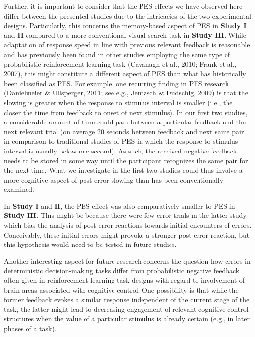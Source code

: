 \documentclass[12pt,openany]{book}
\theoremstyle{definition}
\theoremstyle{definition}
\theoremstyle{definition}
\theoremstyle{remark}
\begin{document}
Further, it is important to consider that the PES effects we have
observed here differ between the presented studies due to the
intricacies of the two experimental designs. Particularly, this concerns
the memory-based aspect of PES in \textbf{Study I} and \textbf{II}
compared to a more conventional visual search task in \textbf{Study
III}. While adaptation of response speed in line with previous relevant
feedback is reasonable and has previously been found in other studies
employing the same type of probabilistic reinforcement learning task
(Cavanagh et al., 2010; Frank et al., 2007), this might constitute a
different aspect of PES than what has historically been classified as
PES. For example, one recurring finding in PES research (Danielmeier \&
Ullsperger, 2011; see e.g., Jentzsch \& Dudschig, 2009) is that the
slowing is greater when the response to stimulus interval is smaller
(i.e., the closer the time from feedback to onset of next stimulus). In
our first two studies, a considerable amount of time could pass between
a particular feedback and the next relevant trial (on average 20 seconds
between feedback and next same pair in comparison to traditional studies
of PES in which the response to stimulus interval is usually below one
second). As such, the received negative feedback needs to be stored in
some way until the participant recognizes the same pair for the next
time. What we investigate in the first two studies could thus involve a
more cognitive aspect of post-error slowing than has been conventionally
examined.

In \textbf{Study I} and \textbf{II}, the PES effect was also
comparatively smaller to PES in \textbf{Study III}. This might be
because there were few error trials in the latter study which bias the
analysis of post-error reactions towards initial encounters of errors.
Conceivably, these initial errors might provoke a stronger post-error
reaction, but this hypothesis would need to be tested in future studies.

Another interesting aspect for future research concerns the question how
errors in deterministic decision-making tasks differ from probabilistic
negative feedback often given in reinforcement learning task designs
with regard to involvement of brain areas associated with cognitive
control. One possibility is that while the former feedback evokes a
similar response independent of the current stage of the task, the
latter might lead to decreasing engagement of relevant cognitive control
structures when the value of a particular stimulus is already certain
(e.g., in later phases of a task).
\end{document}
